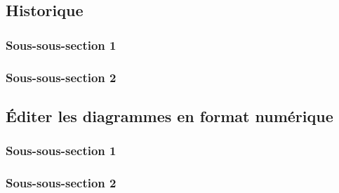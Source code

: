 
\subsection{Historique}
    \subsubsection{Sous-sous-section 1}

    
    \subsubsection{Sous-sous-section 2}

    
    \subsection{Éditer les diagrammes en format numérique}
        \subsubsection{Sous-sous-section 1}


        \subsubsection{Sous-sous-section 2}

